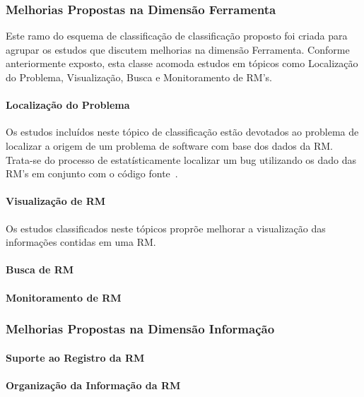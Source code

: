 \subsubsection{Melhorias Propostas na Dimensão Ferramenta}
\label{ssub:melhorias_dim_ferramenta}

Este ramo do esquema de classificação de classificação proposto foi criada para
agrupar os estudos que discutem melhorias na dimensão Ferramenta. Conforme
anteriormente exposto, esta classe acomoda estudos em tópicos como Localização
	do Problema, Visualização, Busca e Monitoramento de RM's.
\paragraph{Localização do Problema}
Os estudos incluídos neste tópico de classificação estão devotados ao problema
de localizar a origem de um problema de software com base dos dados da RM.
Trata-se do processo de estatísticamente localizar um bug utilizando os dado
das RM's em conjunto com o código
	fonte~\cite{Hovemeyer:2004:FBE:1052883.1052895}.

\paragraph{Visualização de RM}
Os estudos classificados neste tópicos proprõe melhorar a visualização das
informações contidas em uma RM.
\paragraph{Busca de RM}

\paragraph{Monitoramento de RM}

\subsubsection{Melhorias Propostas na Dimensão Informação}
\label{ssub:melhorias_dim_informacao}

\paragraph{Suporte ao Registro da RM}

\paragraph{Organização da Informação da RM}


